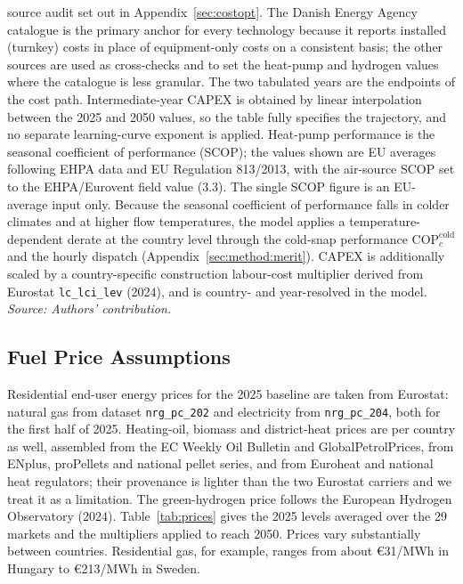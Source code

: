 \begin{table}[H]
source audit set out in Appendix~\ref{sec:costopt}. The Danish Energy Agency
catalogue is the primary anchor for every technology because it reports installed (turnkey) costs in place of equipment-only costs on a consistent basis; the
other sources are used as cross-checks and to set the heat-pump and hydrogen
values where the catalogue is less granular. The two tabulated years are the
endpoints of the cost path. Intermediate-year CAPEX is obtained by linear
interpolation between the 2025 and 2050 values, so the table fully specifies the
trajectory, and no separate learning-curve exponent is applied. Heat-pump
performance is the seasonal coefficient of performance (SCOP); the values shown
are EU averages following EHPA data \citep{EHPA2023scop} and EU Regulation
813/2013, with the air-source SCOP set to the EHPA/Eurovent field value (3.3).
The single SCOP figure is an EU-average input only. Because the seasonal
coefficient of performance falls in colder climates and at higher flow
temperatures, the model applies a temperature-dependent derate at the country
level through the cold-snap performance $\mathrm{COP}^{\mathrm{cold}}_{c}$ and
the hourly dispatch (Appendix~\ref{sec:method:merit}). CAPEX is additionally
scaled by a country-specific construction labour-cost multiplier derived from
Eurostat \texttt{lc\_lci\_lev} (2024), and is country- and year-resolved in the
model.
\\[2pt]{\footnotesize\textit{Source: Authors' contribution.}}
\end{table}


\subsection{Fuel Price Assumptions}
\label{sec:method:prices}

Residential end-user energy prices for the 2025 baseline are taken from Eurostat:
natural gas from dataset \texttt{nrg\_pc\_202} and electricity from
\texttt{nrg\_pc\_204}, both for the first half of 2025. Heating-oil, biomass and
district-heat prices are per country as well, assembled from the EC Weekly Oil Bulletin
and GlobalPetrolPrices, from ENplus, proPellets and national pellet series, and from
Euroheat and national heat regulators; their provenance is lighter than the two Eurostat
carriers and we treat it as a limitation. The green-hydrogen price follows the European
Hydrogen Observatory (2024). Table~\ref{tab:prices} gives the 2025 levels averaged over
the 29 markets and the multipliers applied to reach 2050. Prices vary substantially
between countries. Residential gas, for example, ranges from about \euro{}31/MWh in
Hungary to \euro{}213/MWh in Sweden.

